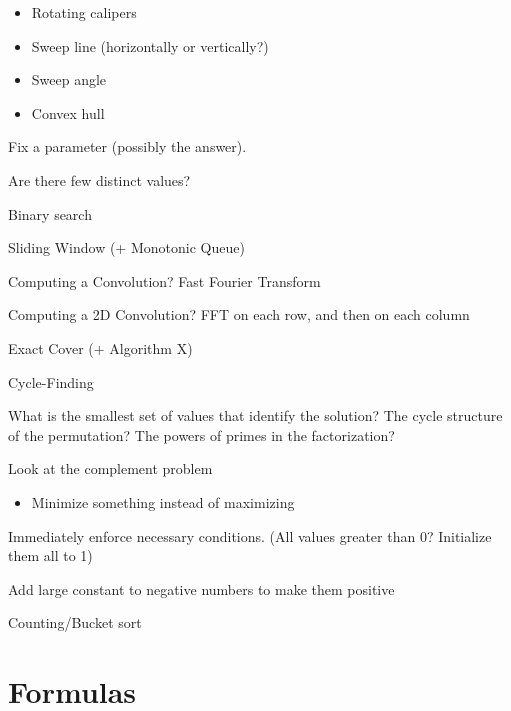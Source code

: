\begin{myitemize}
\begin{itemize}
            \item Rotating calipers
            \item Sweep line (horizontally or vertically?)
            \item Sweep angle
            \item Convex hull
          \end{itemize}
        \item Fix a parameter (possibly the answer).
        \item Are there few distinct values?
        \item Binary search
        \item Sliding Window (+ Monotonic Queue)
        \item Computing a Convolution? Fast Fourier Transform
        \item Computing a 2D Convolution? FFT on each row, and then on each column
        \item Exact Cover (+ Algorithm X)
        \item Cycle-Finding
        \item What is the smallest set of values that identify the solution? The cycle structure of the permutation? The powers of primes in the factorization?
        \item Look at the complement problem
          \begin{itemize}
            \item Minimize something instead of maximizing
          \end{itemize}
        \item Immediately enforce necessary conditions. (All values greater than 0? Initialize them all to 1)
        \item Add large constant to negative numbers to make them positive
        \item Counting/Bucket sort
      \end{myitemize}

  \section{Formulas}



